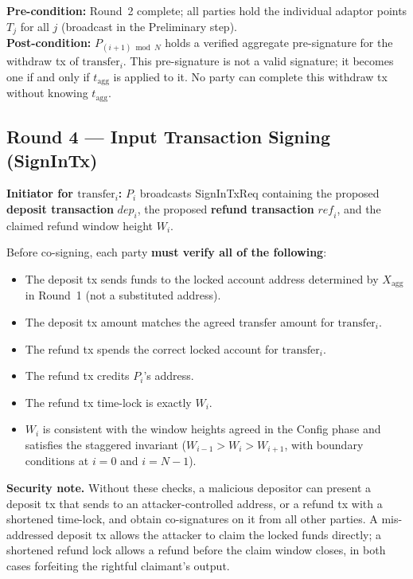\documentclass[11pt,a4paper,dvipsnames]{article}
\newcommand{\msg}[1]{\textsf{#1}}
\newcommand{\tagg}{t_{\mathrm{agg}}}
\newcommand{\Xagg}{X_{\mathrm{agg}}}
\begin{document}
\noindent\textbf{Pre-condition:} Round~2 complete; all parties hold the
individual adaptor points $T_j$ for all $j$ (broadcast in the Preliminary step).\\
\textbf{Post-condition:} $P_{(i+1)\bmod N}$ holds a verified aggregate
pre-signature for the withdraw tx of $\mathrm{transfer}_i$.
This pre-signature is not a valid signature; it becomes one if and only if
$\tagg$ is applied to it.
No party can complete this withdraw tx without knowing $\tagg$.

\subsection{Round 4 — Input Transaction Signing (\msg{SignInTx})}

\textbf{Initiator for $\mathrm{transfer}_i$:}
$P_i$ broadcasts \msg{SignInTxReq} containing the proposed
\textbf{deposit transaction} $\mathit{dep}_i$, the proposed
\textbf{refund transaction} $\mathit{ref}_i$, and the claimed refund window
height $W_i$.

Before co-signing, each party \textbf{must verify all of the following}:
\begin{itemize}
  \item The deposit tx sends funds to the locked account address determined
    by $\Xagg$ in Round~1 (not a substituted address).
  \item The deposit tx amount matches the agreed transfer amount for
    $\mathrm{transfer}_i$.
  \item The refund tx spends the correct locked account for
    $\mathrm{transfer}_i$.
  \item The refund tx credits $P_i$'s address.
  \item The refund tx time-lock is exactly $W_i$.
  \item $W_i$ is consistent with the window heights agreed in the Config
    phase and satisfies the staggered invariant
    ($W_{i-1} > W_i > W_{i+1}$, with boundary conditions at
    $i = 0$ and $i = N-1$).
\end{itemize}

\noindent\textbf{Security note.}\;
Without these checks, a malicious depositor can present a deposit tx that
sends to an attacker-controlled address, or a refund tx with a shortened
time-lock, and obtain co-signatures on it from all other parties.
A mis-addressed deposit tx allows the attacker to claim the locked funds
directly; a shortened refund lock allows a refund before the claim window
closes, in both cases forfeiting the rightful claimant's output.
\end{document}

